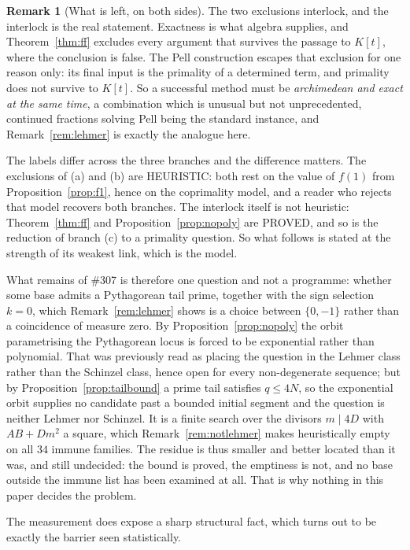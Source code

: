 \documentclass[11pt]{article}
\theoremstyle{definition}
\newtheorem{remark}[theorem]{Remark}
\begin{document}
\begin{remark}[What is left, on both sides]
The two exclusions interlock, and the interlock is the real statement. Exactness is what algebra
supplies, and Theorem~\ref{thm:ff} excludes every argument that survives the passage to $K[t]$,
where the conclusion is false. The Pell construction escapes that exclusion for one reason only:
its final input is the primality of a determined term, and primality does not survive to $K[t]$. So a
successful method must be \emph{archimedean and exact at the same time}, a combination which is
unusual but not unprecedented, continued fractions solving Pell being the standard instance, and
Remark~\ref{rem:lehmer} is exactly the analogue here.

The labels differ across the three branches and the difference matters. The exclusions of (a) and
(b) are \textup{HEURISTIC}: both rest on the value of $f(1)$ from Proposition~\ref{prop:f1}, hence on
the coprimality model, and a reader who rejects that model recovers both branches. The interlock
itself is not heuristic: Theorem~\ref{thm:ff} and Proposition~\ref{prop:nopoly} are
\textup{PROVED}, and so is the reduction of branch (c) to a primality question. So what follows is
stated at the strength of its weakest link, which is the model.

What remains of \#307 is therefore one question and not a programme: whether some base admits a
Pythagorean tail prime, together with the sign selection $k=0$, which Remark~\ref{rem:lehmer} shows
is a choice between $\{0,-1\}$ rather than a coincidence of measure zero. By
Proposition~\ref{prop:nopoly} the orbit parametrising the Pythagorean locus is forced to be
exponential rather than polynomial. That was previously read as placing the question in the Lehmer
class rather than the Schinzel class, hence open for every non-degenerate sequence; but by
Proposition~\ref{prop:tailbound} a prime tail satisfies $q\le4N$, so the exponential orbit supplies
no candidate past a bounded initial segment and the question is neither Lehmer nor Schinzel. It is a
finite search over the divisors $m\mid4D$ with $AB+Dm^2$ a square, which
Remark~\ref{rem:notlehmer} makes heuristically empty on all $34$ immune families. The residue is
thus smaller and better located than it was, and still undecided: the bound is proved, the
emptiness is not, and no base outside the immune list has been examined at all. That is why nothing
in this paper decides the problem.
\end{remark}

The measurement does expose a sharp structural fact, which turns out to be exactly the barrier seen
statistically.
\end{document}
